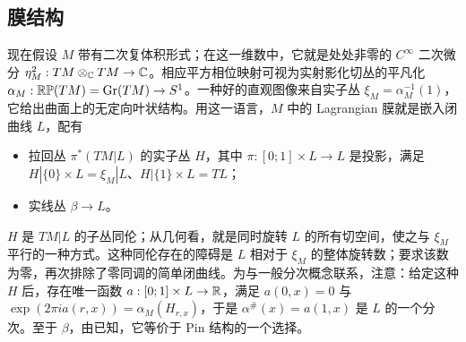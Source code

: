 \subsection{膜结构}\label{sec:13c}
现在假设 $M$ 带有二次复体积形式；在这一维数中，它就是处处非零的 $C^\infty$ 二次微分 $\eta_M^2:TM\otimes_{\mathbb C} TM\to\mathbb C$。相应平方相位映射可视为实射影化切丛的平凡化 $\alpha_M:\mathbb{RP}(TM)=\operatorname{Gr}(TM)\to S^1$。一种好的直观图像来自实子丛 $\xi_M=\alpha_M^{-1}(1)$，它给出曲面上的无定向叶状结构。用这一语言，$M$ 中的 Lagrangian 膜就是嵌入闭曲线 $L$，配有
\begin{itemize}
\item 拉回丛 $\pi^*(TM|L)$ 的实子丛 $H$，其中 $\pi:[0;1]\times L\to L$ 是投影，满足 $H|\{0\}\times L=\xi_M|L$、$H|\{1\}\times L=TL$；
\item 实线丛 $\beta\to L$。
\end{itemize}
$H$ 是 $TM|L$ 的子丛同伦；从几何看，就是同时旋转 $L$ 的所有切空间，使之与 $\xi_M$ 平行的一种方式。这种同伦存在的障碍是 $L$ 相对于 $\xi_M$ 的整体旋转数；要求该数为零，再次排除了零同调的简单闭曲线。为与一般分次概念联系，注意：给定这种 $H$ 后，存在唯一函数 $a:[0;1]\times L\to\mathbb R$，满足 $a(0,\allowbreak x)=0$ 与 $\exp(2\pi ia(r,\allowbreak x))=\alpha_M(H_{r,\allowbreak x})$，于是 $\alpha^\#(x)=a(1,\allowbreak x)$ 是 $L$ 的一个分次。至于 $\beta$，由已知，它等价于 Pin 结构的一个选择。

